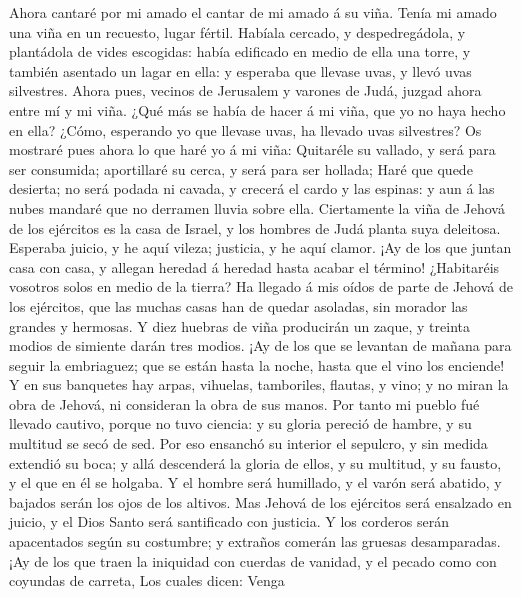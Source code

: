 Ahora cantaré por mi amado el cantar de mi amado á su
viña. Tenía mi amado una viña en un recuesto, lugar fértil.
 Habíala cercado, y despedregádola, y plantádola de vides
escogidas: había edificado en medio de ella una torre, y también
asentado un lagar en ella: y esperaba que llevase uvas, y llevó uvas
silvestres.  Ahora pues, vecinos de Jerusalem y varones de
Judá, juzgad ahora entre mí y mi viña.  ¿Qué más se había
de hacer á mi viña, que yo no haya hecho en ella? ¿Cómo, esperando yo
que llevase uvas, ha llevado uvas silvestres?  Os mostraré
pues ahora lo que haré yo á mi viña: Quitaréle su vallado, y será para
ser consumida; aportillaré su cerca, y será para ser hollada;
 Haré que quede desierta; no será podada ni cavada, y
crecerá el cardo y las espinas: y aun á las nubes mandaré que no
derramen lluvia sobre ella.  Ciertamente la viña de Jehová
de los ejércitos es la casa de Israel, y los hombres de Judá planta suya
deleitosa. Esperaba juicio, y he aquí vileza; justicia, y he aquí
clamor.  ¡Ay de los que juntan casa con casa, y allegan
heredad á heredad hasta acabar el término! ¿Habitaréis vosotros solos en
medio de la tierra?  Ha llegado á mis oídos de parte de
Jehová de los ejércitos, que las muchas casas han de quedar asoladas,
sin morador las grandes y hermosas.  Y diez huebras de
viña producirán un zaque, y treinta modios de simiente darán tres
modios.  ¡Ay de los que se levantan de mañana para seguir
la embriaguez; que se están hasta la noche, hasta que el vino los
enciende!  Y en sus banquetes hay arpas, vihuelas,
tamboriles, flautas, y vino; y no miran la obra de Jehová, ni consideran
la obra de sus manos.  Por tanto mi pueblo fué llevado
cautivo, porque no tuvo ciencia: y su gloria pereció de hambre, y su
multitud se secó de sed.  Por eso ensanchó su interior el
sepulcro, y sin medida extendió su boca; y allá descenderá la gloria de
ellos, y su multitud, y su fausto, y el que en él se holgaba.
 Y el hombre será humillado, y el varón será abatido, y
bajados serán los ojos de los altivos.  Mas Jehová de los
ejércitos será ensalzado en juicio, y el Dios Santo será santificado con
justicia.  Y los corderos serán apacentados según su
costumbre; y extraños comerán las gruesas desamparadas. 
¡Ay de los que traen la iniquidad con cuerdas de vanidad, y el pecado
como con coyundas de carreta,  Los cuales dicen: Venga
